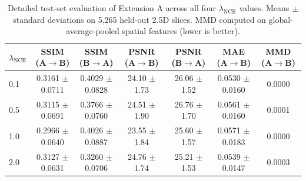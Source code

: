 \begin{table}[t]
\centering
\caption{Detailed test-set evaluation of Extension A across all four $\lambda_{\mathrm{NCE}}$ values. Means $\pm$ standard deviations on 5{,}265 held-out 2.5D slices. MMD computed on global-average-pooled spatial features (lower is better).}
\label{tab:patchnce_testset}
\begin{tabular}{lcccccc}
\toprule
$\lambda_{\mathrm{NCE}}$ & SSIM (A$\rightarrow$B) & SSIM (B$\rightarrow$A) & PSNR (A$\rightarrow$B) & PSNR (B$\rightarrow$A) & MAE (A$\rightarrow$B) & MMD (A$\rightarrow$B) \\
\midrule
0.1 & 0.3161 $\pm$ 0.0711 & 0.4029 $\pm$ 0.0828 & 24.10 $\pm$ 1.73 & 26.06 $\pm$ 1.52 & 0.0530 $\pm$ 0.0160 & 0.0000 \\
0.5 & 0.3115 $\pm$ 0.0691 & 0.3766 $\pm$ 0.0760 & 24.51 $\pm$ 1.90 & 26.76 $\pm$ 1.70 & 0.0561 $\pm$ 0.0160 & 0.0001 \\
1.0 & 0.2966 $\pm$ 0.0640 & 0.4026 $\pm$ 0.0887 & 23.55 $\pm$ 1.84 & 25.60 $\pm$ 1.57 & 0.0571 $\pm$ 0.0183 & 0.0000 \\
2.0 & 0.3127 $\pm$ 0.0631 & 0.3260 $\pm$ 0.0706 & 24.76 $\pm$ 1.74 & 25.21 $\pm$ 1.53 & 0.0539 $\pm$ 0.0147 & 0.0003 \\
\bottomrule
\end{tabular}
\end{table}
